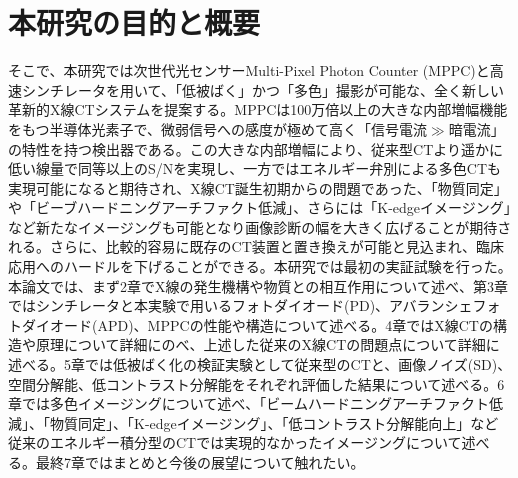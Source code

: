 \section{本研究の目的と概要}
そこで、本研究では次世代光センサーMulti-Pixel Photon Counter (MPPC)と高速シンチレータを用いて、「低被ばく」かつ「多色」撮影が可能な、全く新しい革新的X線CTシステムを提案する。MPPCは100万倍以上の大きな内部増幅機能をもつ半導体光素子で、微弱信号への感度が極めて高く「信号電流$\gg$暗電流」の特性を持つ検出器である。この大きな内部増幅により、従来型CTより遥かに低い線量で同等以上のS/Nを実現し、一方ではエネルギー弁別による多色CTも実現可能になると期待され、X線CT誕生初期からの問題であった、「物質同定」や「ビーブハードニングアーチファクト低減」、さらには「K-edgeイメージング」など新たなイメージングも可能となり画像診断の幅を大きく広げることが期待される。さらに、比較的容易に既存のCT装置と置き換えが可能と見込まれ、臨床応用へのハードルを下げることができる。本研究では最初の実証試験を行った。
本論文では、まず2章でX線の発生機構や物質との相互作用について述べ、第3章ではシンチレータと本実験で用いるフォトダイオード(PD)、アバランシェフォトダイオード(APD)、MPPCの性能や構造について述べる。4章ではX線CTの構造や原理について詳細にのべ、上述した従来のX線CTの問題点について詳細に述べる。5章では低被ばく化の検証実験として従来型のCTと、画像ノイズ(SD)、空間分解能、低コントラスト分解能をそれぞれ評価した結果について述べる。6章では多色イメージングについて述べ、「ビームハードニングアーチファクト低減」、「物質同定」、「K-edgeイメージング」、「低コントラスト分解能向上」など従来のエネルギー積分型のCTでは実現的なかったイメージングについて述べる。最終7章ではまとめと今後の展望について触れたい。






